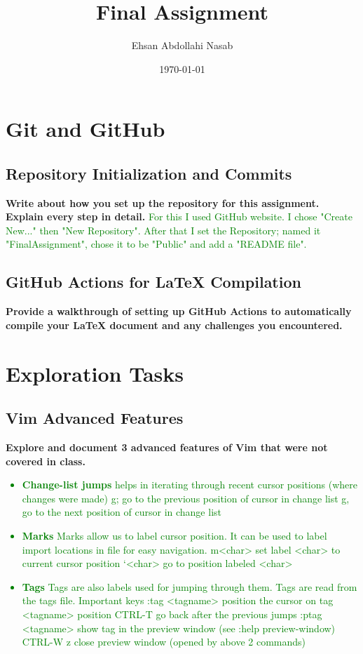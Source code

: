 \documentclass{article}
\title{Final Assignment}
\author{Ehsan Abdollahi Nasab}
\date{\today}
\begin{document}
\maketitle

\section{Git and GitHub}
\subsection{Repository Initialization and Commits}
\textbf{Write about how you set up the repository for this assignment. Explain every step in detail.}
\textcolor{green}{For this I used GitHub website. I chose "Create New..." then "New Repository". After that I set the Repository; named it "FinalAssignment", chose it to be "Public" and add a "README file".}

\subsection{GitHub Actions for LaTeX Compilation}
\textbf{Provide a walkthrough of setting up GitHub Actions to automatically compile your LaTeX document and any challenges you encountered.}
\textcolor{green}{}

\section{Exploration Tasks}
\subsection{Vim Advanced Features}
\textbf{Explore and document 3 advanced features of Vim that were not covered in class.}
\textcolor{green}{\begin{itemize}
    \item \textbf{Change-list jumps} helps in iterating through recent cursor positions (where changes were made)
    g; go to the previous position of cursor in change list
    g, go to the next position of cursor in change list
    \item \textbf{Marks} Marks allow us to label cursor position. It can be used to label import
    locations in file for easy navigation.
    m<char> set label <char> to current cursor position
    ‘<char> go to position labeled <char>
    \item \textbf{Tags} Tags are also labels used for jumping through them. Tags are read from the
    tags file.
    Important keys
    :tag <tagname> position the cursor on tag <tagname> position
    CTRL-T go back after the previous jumps
    :ptag <tagname> show tag in the preview window (see :help preview-window)
    CTRL-W z close preview window (opened by above 2 commands)\end{itemize}
}
\end{document}
